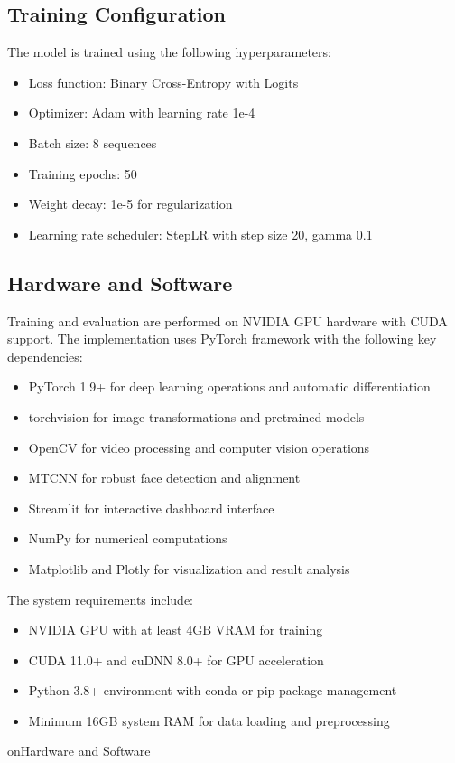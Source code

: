 \documentclass[conference]{IEEEtran}
\begin{document}
\subsection{Training Configuration}

The model is trained using the following hyperparameters:
\begin{itemize}
\item Loss function: Binary Cross-Entropy with Logits \cite{zhang2018generalized}
\item Optimizer: Adam with learning rate 1e-4 \cite{kingma2014adam}
\item Batch size: 8 sequences
\item Training epochs: 50
\item Weight decay: 1e-5 for regularization \cite{krogh1992simple}
\item Learning rate scheduler: StepLR with step size 20, gamma 0.1
\end{itemize}

\subsection{Hardware and Software}

Training and evaluation are performed on NVIDIA GPU hardware with CUDA support. The implementation uses PyTorch framework \cite{paszke2019pytorch} with the following key dependencies:
\begin{itemize}
\item PyTorch 1.9+ for deep learning operations and automatic differentiation
\item torchvision for image transformations and pretrained models \cite{marcel2010torchvision}
\item OpenCV for video processing and computer vision operations \cite{bradski2000opencv}
\item MTCNN for robust face detection and alignment \cite{zhang2016joint}
\item Streamlit for interactive dashboard interface \cite{streamlit2019}
\item NumPy for numerical computations \cite{harris2020array}
\item Matplotlib and Plotly for visualization and result analysis \cite{hunter2007matplotlib}
\end{itemize}

The system requirements include:
\begin{itemize}
\item NVIDIA GPU with at least 4GB VRAM for training
\item CUDA 11.0+ and cuDNN 8.0+ for GPU acceleration
\item Python 3.8+ environment with conda or pip package management
\item Minimum 16GB system RAM for data loading and preprocessing
\end{itemize}on{Hardware and Software}
\end{document}
